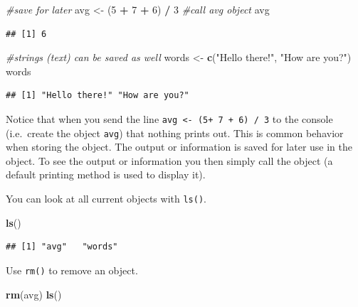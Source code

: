 \documentclass[
]{book}
\newenvironment{Shaded}{\begin{snugshade}}{\end{snugshade}}
\newcommand{\CommentTok}[1]{\textcolor[rgb]{0.56,0.35,0.01}{\textit{#1}}}
\newcommand{\DecValTok}[1]{\textcolor[rgb]{0.00,0.00,0.81}{#1}}
\newcommand{\KeywordTok}[1]{\textcolor[rgb]{0.13,0.29,0.53}{\textbf{#1}}}
\newcommand{\NormalTok}[1]{#1}
\newcommand{\OperatorTok}[1]{\textcolor[rgb]{0.81,0.36,0.00}{\textbf{#1}}}
\newcommand{\StringTok}[1]{\textcolor[rgb]{0.31,0.60,0.02}{#1}}
\theoremstyle{definition}
\theoremstyle{definition}
\theoremstyle{definition}
\theoremstyle{remark}
\begin{document}
\begin{Shaded}
\begin{Highlighting}[]
\CommentTok{#save for later}
\NormalTok{avg <-}\StringTok{ }\NormalTok{(}\DecValTok{5} \OperatorTok{+}\StringTok{ }\DecValTok{7} \OperatorTok{+}\StringTok{ }\DecValTok{6}\NormalTok{) }\OperatorTok{/}\StringTok{ }\DecValTok{3}
\CommentTok{#call avg object}
\NormalTok{avg}
\end{Highlighting}
\end{Shaded}

\begin{verbatim}
## [1] 6
\end{verbatim}

\begin{Shaded}
\begin{Highlighting}[]
\CommentTok{#strings (text) can be saved as well}
\NormalTok{words <-}\StringTok{ }\KeywordTok{c}\NormalTok{(}\StringTok{"Hello there!"}\NormalTok{, }\StringTok{"How are you?"}\NormalTok{)}
\NormalTok{words}
\end{Highlighting}
\end{Shaded}

\begin{verbatim}
## [1] "Hello there!" "How are you?"
\end{verbatim}

Notice that when you send the line \texttt{avg\ \textless{}-\ (5+\ 7\ +\ 6)\ /\ 3} to the console (i.e.~create the object \texttt{avg}) that nothing prints out. This is common behavior when storing the object. The output or information is saved for later use in the object. To see the output or information you then simply call the object (a default printing method is used to display it).

You can look at all current objects with \texttt{ls()}.

\begin{Shaded}
\begin{Highlighting}[]
\KeywordTok{ls}\NormalTok{()}
\end{Highlighting}
\end{Shaded}

\begin{verbatim}
## [1] "avg"   "words"
\end{verbatim}

Use \texttt{rm()} to remove an object.

\begin{Shaded}
\begin{Highlighting}[]
\KeywordTok{rm}\NormalTok{(avg)}
\KeywordTok{ls}\NormalTok{()}
\end{Highlighting}
\end{Shaded}
\end{document}
